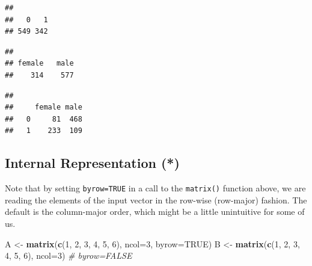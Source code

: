 \documentclass[10pt,b5paper,krantz1]{krantz}
\newenvironment{Shaded}{\begin{snugshade}}{\end{snugshade}}
\newcommand{\CommentTok}[1]{\textcolor[rgb]{0.37,0.37,0.37}{\textit{#1}}}
\newcommand{\DataTypeTok}[1]{\textcolor[rgb]{0.27,0.27,0.27}{#1}}
\newcommand{\DecValTok}[1]{\textcolor[rgb]{0.06,0.06,0.06}{#1}}
\newcommand{\KeywordTok}[1]{\textcolor[rgb]{0.27,0.27,0.27}{\textbf{#1}}}
\newcommand{\NormalTok}[1]{#1}
\newcommand{\OperatorTok}[1]{\textcolor[rgb]{0.43,0.43,0.43}{\textbf{#1}}}
\newcommand{\OtherTok}[1]{\textcolor[rgb]{0.37,0.37,0.37}{#1}}
\newcommand{\StringTok}[1]{\textcolor[rgb]{0.5,0.5,0.5}{#1}}
\begin{document}
\begin{verbatim}
## 
##   0   1 
## 549 342
\end{verbatim}

\begin{Shaded}
\end{Shaded}

\begin{verbatim}
## 
## female   male 
##    314    577
\end{verbatim}

\begin{Shaded}
\end{Shaded}

\begin{verbatim}
##    
##     female male
##   0     81  468
##   1    233  109
\end{verbatim}

\hypertarget{internal-representation-1}{%
\subsection{Internal Representation (*)}\label{internal-representation-1}}

Note that by setting \texttt{byrow=TRUE} in a call to the \texttt{matrix()} function above,
we are reading the elements
of the input vector in the row-wise (row-major) fashion.
The default is the column-major order, which might be a little unintuitive
for some of us.

\begin{Shaded}
\begin{Highlighting}[]
\NormalTok{A <-}\StringTok{ }\KeywordTok{matrix}\NormalTok{(}\KeywordTok{c}\NormalTok{(}\DecValTok{1}\NormalTok{, }\DecValTok{2}\NormalTok{, }\DecValTok{3}\NormalTok{, }\DecValTok{4}\NormalTok{, }\DecValTok{5}\NormalTok{, }\DecValTok{6}\NormalTok{), }\DataTypeTok{ncol=}\DecValTok{3}\NormalTok{, }\DataTypeTok{byrow=}\OtherTok{TRUE}\NormalTok{)}
\NormalTok{B <-}\StringTok{ }\KeywordTok{matrix}\NormalTok{(}\KeywordTok{c}\NormalTok{(}\DecValTok{1}\NormalTok{, }\DecValTok{2}\NormalTok{, }\DecValTok{3}\NormalTok{, }\DecValTok{4}\NormalTok{, }\DecValTok{5}\NormalTok{, }\DecValTok{6}\NormalTok{), }\DataTypeTok{ncol=}\DecValTok{3}\NormalTok{) }\CommentTok{# byrow=FALSE}
\end{Highlighting}
\end{Shaded}
\end{document}
